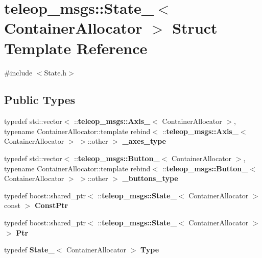 \section{teleop\_\-msgs::State\_\-$<$ ContainerAllocator $>$ Struct Template Reference}
\label{structteleop__msgs_1_1State__}


{\ttfamily \#include $<$State.h$>$}

\subsection*{Public Types}
\begin{DoxyCompactItemize}
\item 
typedef std::vector$<$ ::{\bf teleop\_\-msgs::Axis\_\-}$<$ ContainerAllocator $>$, typename ContainerAllocator::template rebind$<$ ::{\bf teleop\_\-msgs::Axis\_\-}$<$ ContainerAllocator $>$ $>$::other $>$ {\bf \_\-axes\_\-type}
\item 
typedef std::vector$<$ ::{\bf teleop\_\-msgs::Button\_\-}$<$ ContainerAllocator $>$, typename ContainerAllocator::template rebind$<$ ::{\bf teleop\_\-msgs::Button\_\-}$<$ ContainerAllocator $>$ $>$::other $>$ {\bf \_\-buttons\_\-type}
\item 
typedef boost::shared\_\-ptr$<$ ::{\bf teleop\_\-msgs::State\_\-}$<$ ContainerAllocator $>$ const  $>$ {\bf ConstPtr}
\item 
typedef boost::shared\_\-ptr$<$ ::{\bf teleop\_\-msgs::State\_\-}$<$ ContainerAllocator $>$ $>$ {\bf Ptr}
\item 
typedef {\bf State\_\-}$<$ ContainerAllocator $>$ {\bf Type}
\end{DoxyCompactItemize}
